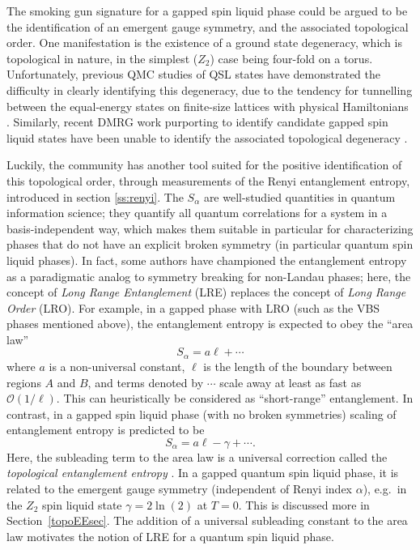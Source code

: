 \documentclass[range]{ar2e}
\begin{document}
The smoking gun signature for a gapped spin liquid phase could be argued to be the identification of an emergent gauge symmetry,
and the associated topological order.  One manifestation is the existence of a ground state degeneracy, which is topological in nature, in the simplest ($Z_2$) case being four-fold on a torus.  Unfortunately, previous QMC studies of QSL states have demonstrated the difficulty in clearly identifying this degeneracy, due to the tendency for tunnelling between the equal-energy states on finite-size lattices with physical Hamiltonians \cite{Isakov1}.  Similarly, recent DMRG work purporting to identify candidate gapped spin liquid states have been unable to identify the associated topological degeneracy \cite{Yan,J1J2}.

Luckily, the community has another tool suited for the positive identification of this topological order, through measurements of the Renyi entanglement entropy, introduced in section \ref{ss:renyi}.  The $S_{\alpha}$ are well-studied quantities in quantum information science; they quantify all quantum correlations for a system in a basis-independent way, which makes them suitable in particular for characterizing phases that do not have an explicit broken symmetry (in particular quantum spin liquid phases).  In fact, some authors have championed the entanglement entropy as a paradigmatic analog to symmetry breaking for non-Landau phases; here, the concept of {\it Long Range Entanglement} (LRE) replaces the concept of {\it Long Range Order} (LRO).  For example, in a gapped phase with LRO (such as the VBS phases mentioned above),
the entanglement entropy is expected to obey the ``area law''
\begin{equation} 
S_{\alpha} = a\ell + \cdots
\end{equation}
where $a$ is a non-universal constant, $\ell$ is the length of the boundary between regions $A$ and $B$, and terms denoted by $\cdots$ scale away at least as fast as $\mathcal{O} (1/\ell)$.  This can heuristically be considered as ``short-range'' entanglement.  In contrast, in a gapped spin liquid phase (with no broken symmetries)
scaling of entanglement entropy is predicted to be
\begin{equation}
S_{\alpha} = a \ell - \gamma + \cdots \label{areaL}.
\end{equation}
 Here, the subleading term to the area law is a universal correction called the {\it topological entanglement entropy} \cite{Alioscia1,Alioscia2,LW,KP}.  In a gapped quantum spin liquid phase, it is related to the emergent gauge symmetry (independent \cite{Flammia} of Renyi index $\alpha$), e.g.~in the $Z_2$ spin liquid state $\gamma = 2 \ln(2)$ at $T=0$.  This is discussed more in Section~\ref{topoEEsec}.
 The addition of a universal subleading constant to the area law motivates the notion of LRE for a quantum spin liquid phase.
\end{document}
